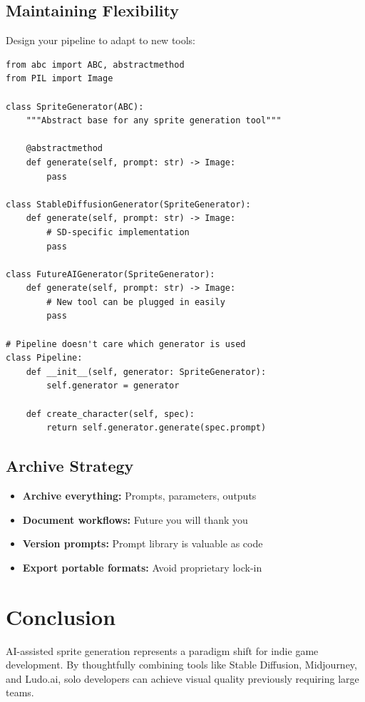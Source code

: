 \documentclass[11pt]{article}
\begin{document}
\subsection{Maintaining Flexibility}

Design your pipeline to adapt to new tools:

\begin{verbatim}
from abc import ABC, abstractmethod
from PIL import Image

class SpriteGenerator(ABC):
    """Abstract base for any sprite generation tool"""

    @abstractmethod
    def generate(self, prompt: str) -> Image:
        pass

class StableDiffusionGenerator(SpriteGenerator):
    def generate(self, prompt: str) -> Image:
        # SD-specific implementation
        pass

class FutureAIGenerator(SpriteGenerator):
    def generate(self, prompt: str) -> Image:
        # New tool can be plugged in easily
        pass

# Pipeline doesn't care which generator is used
class Pipeline:
    def __init__(self, generator: SpriteGenerator):
        self.generator = generator

    def create_character(self, spec):
        return self.generator.generate(spec.prompt)
\end{verbatim}

\subsection{Archive Strategy}

\begin{itemize}
    \item \textbf{Archive everything:} Prompts, parameters, outputs
    \item \textbf{Document workflows:} Future you will thank you
    \item \textbf{Version prompts:} Prompt library is valuable as code
    \item \textbf{Export portable formats:} Avoid proprietary lock-in
\end{itemize}

\section{Conclusion}

AI-assisted sprite generation represents a paradigm shift for indie game development. By thoughtfully combining tools like Stable Diffusion, Midjourney, and Ludo.ai, solo developers can achieve visual quality previously requiring large teams.
\end{document}

